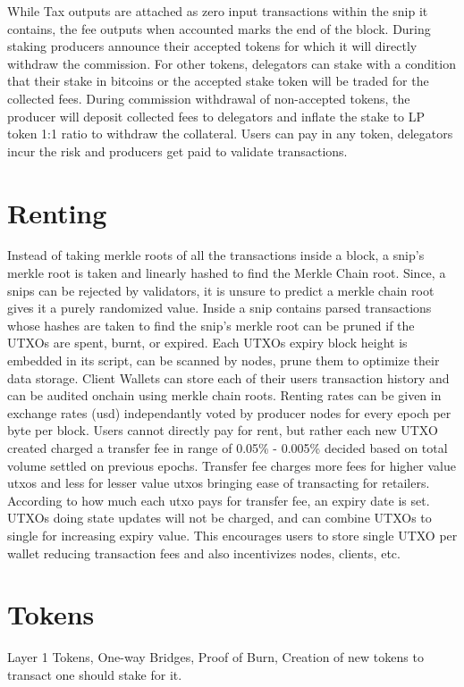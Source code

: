 \documentclass[a4paper,10pt]{article}
\begin{document}
While Tax outputs are attached as zero input transactions within the snip it contains, the fee outputs when accounted marks the end of the block. During staking producers announce their accepted tokens for which it will directly withdraw the commission. For other tokens, delegators can stake with a condition that their stake in bitcoins or the accepted stake token will be traded for the collected fees. During commission withdrawal of non-accepted tokens, the producer will deposit collected fees to delegators and inflate the stake to LP token 1:1 ratio to withdraw the collateral. Users can pay in any token, delegators incur the risk and producers get paid to validate transactions.

\section{Renting}
Instead of taking merkle roots of all the transactions inside a block, a snip's merkle root is taken and linearly hashed to find the Merkle Chain root. Since, a snips can be rejected by validators, it is unsure to predict a merkle chain root gives it a purely randomized value. Inside a snip contains parsed transactions whose hashes are taken to find the snip's merkle root can be pruned if the UTXOs are spent, burnt, or expired. Each UTXOs expiry block height is embedded in its script, can be scanned by nodes, prune them to optimize their data storage. Client Wallets can store each of their users transaction history and can be audited onchain using merkle chain roots. Renting rates can be given in exchange rates (usd) independantly voted by producer nodes for every epoch per byte per block. Users cannot directly pay for rent, but rather each new UTXO created charged a transfer fee in range of 0.05\% - 0.005\% decided based on total volume settled on previous epochs. Transfer fee charges more fees for higher value utxos and less for lesser value utxos bringing ease of transacting for retailers. According to how much each utxo pays for transfer fee, an expiry date is set. UTXOs doing state updates will not be charged, and can combine UTXOs to single for increasing expiry value. This encourages users to store single UTXO per wallet reducing transaction fees and also incentivizes nodes, clients, etc.  

\section{Tokens}
Layer 1 Tokens, One-way Bridges, Proof of Burn, Creation of new tokens to transact one should stake for it.
\end{document}
